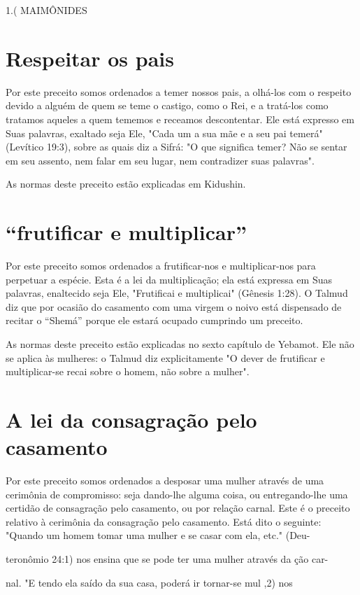 1.( MAIMÔNIDES

\section{Respeitar os pais}

Por este preceito somos ordenados a temer nossos pais, a olhá-los com o
respeito devido a alguém de quem se teme o castigo, como o Rei, e a
tratá-los como tratamos aqueles a quem tememos e receamos descontentar.
Ele está expresso em Suas palavras, exaltado seja Ele, "Cada um a sua
mãe e a seu pai temerá" (Levítico 19:3), sobre as quais diz a Sifrá: "O
que significa temer? Não se sentar em seu assento, nem falar em seu
lugar, nem contradizer suas palavras".


As normas deste preceito estão explicadas em Kidushin.


\section{``frutificar e multiplicar''}

Por este preceito somos ordenados a frutificar-nos e multiplicar-nos
para perpetuar a espécie. Esta é a lei da multiplicação; ela está
expressa em Suas palavras, enaltecido seja Ele, "Frutificai e
multiplicai" (Gênesis 1:28). O Talmud diz que por ocasião do casamento
com uma virgem o noivo está dispensado de recitar o ``Shemá'' porque ele
estará ocupado cumprindo um preceito.

As normas deste preceito estão explicadas no sexto capítulo de Ye­bamot.
Ele não se aplica às mulheres: o Talmud diz explicitamente "O dever de
frutificar e multiplicar-se recai sobre o homem, não sobre a mulher".

\section{A lei da consagração pelo casamento}

Por este preceito somos ordenados a desposar uma mulher através de uma
cerimônia de compromisso: seja dando-lhe alguma coisa, ou entregando-lhe
uma certidão de consagração pelo casamento, ou por relação carnal. Este
é o preceito relativo à cerimônia da consagração pelo casamento. Está
dito o seguinte: "Quando um homem tomar uma mulher e se casar com ela,
etc." (Deu-

teronômio 24:1) nos ensina que se pode ter uma mulher através da ção
car-

nal. "E tendo ela saído da sua casa, poderá ir tornar-se mul ,2) nos

